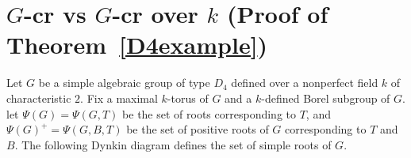 \section{$G$-cr vs $G$-cr over $k$ (Proof of Theorem~\ref{D4example})}
Let $G$ be a simple algebraic group of type $D_4$ defined over a nonperfect field $k$ of characteristic $2$. Fix a maximal $k$-torus of $G$ and a $k$-defined Borel subgroup of $G$. let $\Psi(G)=\Psi(G,T)$ be the set of roots corresponding to $T$, and $\Psi(G)^{+}=\Psi(G,B,T)$ be the set of positive roots of $G$ corresponding to $T$ and $B$. The following Dynkin diagram defines the set of simple roots of $G$.
\begin{figure}[h]
                \centering
\end{figure}

